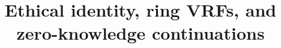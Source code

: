 \documentclass{llncs}
\title{Ethical identity, ring VRFs, and zero-knowledge continuations}
\def\eprint#1#2{#2} %
\begin{document}
	
\maketitle

\begin{abstract}

\end{abstract}


%

% 



%  












\appendix


\eprint{}{}

\end{document}
